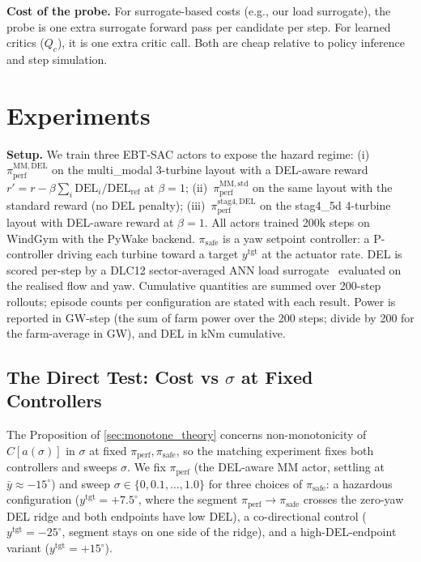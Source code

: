 \documentclass{article}
\begin{document}
\textbf{Cost of the probe.}
For surrogate-based costs (e.g., our load surrogate), the probe is one extra surrogate forward pass per candidate per step.
For learned critics ($Q_c$), it is one extra critic call.
Both are cheap relative to policy inference and step simulation.

\section{Experiments}
\label{sec:results}

\textbf{Setup.}
We train three EBT-SAC actors to expose the hazard regime:
(i)~$\pi_{\mathrm{perf}}^{\mathrm{MM,DEL}}$ on the multi\_modal 3-turbine layout with a DEL-aware reward $r' = r - \beta \sum_i \mathrm{DEL}_i / \mathrm{DEL}_{\mathrm{ref}}$ at $\beta=1$;
(ii)~$\pi_{\mathrm{perf}}^{\mathrm{MM,std}}$ on the same layout with the standard reward (no DEL penalty);
(iii)~$\pi_{\mathrm{perf}}^{\mathrm{stag4,DEL}}$ on the stag4\_5d 4-turbine layout with DEL-aware reward at $\beta=1$.
All actors trained 200k steps on WindGym with the PyWake backend.
$\pi_{\mathrm{safe}}$ is a yaw setpoint controller: a P-controller driving each turbine toward a target $y^{\mathrm{tgt}}$ at the actuator rate.
DEL is scored per-step by a DLC12 sector-averaged ANN load surrogate~\citep{guillore2024sectoravg} evaluated on the realised flow and yaw.
Cumulative quantities are summed over 200-step rollouts; episode counts per configuration are stated with each result.
Power is reported in GW-step (the sum of farm power over the 200 steps; divide by 200 for the farm-average in GW), and DEL in kNm cumulative.

\subsection{The Direct Test: Cost vs \texorpdfstring{$\sigma$}{sigma} at Fixed Controllers}
\label{sec:sigma_sweep_exp}

The Proposition of \cref{sec:monotone_theory} concerns non-monotonicity of $C[a(\sigma)]$ in $\sigma$ at fixed $\pi_{\mathrm{perf}}, \pi_{\mathrm{safe}}$, so the matching experiment fixes both controllers and sweeps $\sigma$.
We fix $\pi_{\mathrm{perf}}$ (the DEL-aware MM actor, settling at $\bar y \approx -15^\circ$) and sweep $\sigma\in\{0, 0.1, \ldots, 1.0\}$ for three choices of $\pi_{\mathrm{safe}}$:
a hazardous configuration ($y^{\mathrm{tgt}}=+7.5^\circ$, where the segment $\pi_{\mathrm{perf}}\!\to\!\pi_{\mathrm{safe}}$ crosses the zero-yaw DEL ridge and both endpoints have low DEL), a co-directional control ($y^{\mathrm{tgt}}=-25^\circ$, segment stays on one side of the ridge), and a high-DEL-endpoint variant ($y^{\mathrm{tgt}}=+15^\circ$).
\end{document}
